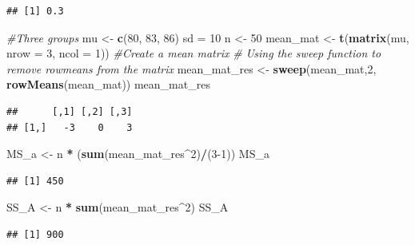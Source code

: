 \documentclass[]{book}
\newenvironment{Shaded}{\begin{snugshade}}{\end{snugshade}}
\newcommand{\CommentTok}[1]{\textcolor[rgb]{0.56,0.35,0.01}{\textit{#1}}}
\newcommand{\DataTypeTok}[1]{\textcolor[rgb]{0.13,0.29,0.53}{#1}}
\newcommand{\DecValTok}[1]{\textcolor[rgb]{0.00,0.00,0.81}{#1}}
\newcommand{\KeywordTok}[1]{\textcolor[rgb]{0.13,0.29,0.53}{\textbf{#1}}}
\newcommand{\NormalTok}[1]{#1}
\newcommand{\OperatorTok}[1]{\textcolor[rgb]{0.81,0.36,0.00}{\textbf{#1}}}
\newcommand{\StringTok}[1]{\textcolor[rgb]{0.31,0.60,0.02}{#1}}
\begin{document}
\begin{verbatim}
## [1] 0.3
\end{verbatim}

\begin{Shaded}
\begin{Highlighting}[]
\CommentTok{#Three groups}
\NormalTok{mu <-}\StringTok{ }\KeywordTok{c}\NormalTok{(}\DecValTok{80}\NormalTok{, }\DecValTok{83}\NormalTok{, }\DecValTok{86}\NormalTok{)}
\NormalTok{sd =}\StringTok{ }\DecValTok{10}
\NormalTok{n <-}\StringTok{ }\DecValTok{50}
\NormalTok{mean_mat <-}\StringTok{ }\KeywordTok{t}\NormalTok{(}\KeywordTok{matrix}\NormalTok{(mu, }
                     \DataTypeTok{nrow =} \DecValTok{3}\NormalTok{,}
                     \DataTypeTok{ncol =} \DecValTok{1}\NormalTok{)) }\CommentTok{#Create a mean matrix}
\CommentTok{# Using the sweep function to remove rowmeans from the matrix}
\NormalTok{mean_mat_res <-}\StringTok{ }\KeywordTok{sweep}\NormalTok{(mean_mat,}\DecValTok{2}\NormalTok{, }\KeywordTok{rowMeans}\NormalTok{(mean_mat))   }
\NormalTok{mean_mat_res}
\end{Highlighting}
\end{Shaded}

\begin{verbatim}
##      [,1] [,2] [,3]
## [1,]   -3    0    3
\end{verbatim}

\begin{Shaded}
\begin{Highlighting}[]
\NormalTok{MS_a <-}\StringTok{ }\NormalTok{n }\OperatorTok{*}\StringTok{ }\NormalTok{(}\KeywordTok{sum}\NormalTok{(mean_mat_res}\OperatorTok{^}\DecValTok{2}\NormalTok{)}\OperatorTok{/}\NormalTok{(}\DecValTok{3-1}\NormalTok{))}
\NormalTok{MS_a}
\end{Highlighting}
\end{Shaded}

\begin{verbatim}
## [1] 450
\end{verbatim}

\begin{Shaded}
\begin{Highlighting}[]
\NormalTok{SS_A <-}\StringTok{ }\NormalTok{n }\OperatorTok{*}\StringTok{ }\KeywordTok{sum}\NormalTok{(mean_mat_res}\OperatorTok{^}\DecValTok{2}\NormalTok{)}
\NormalTok{SS_A}
\end{Highlighting}
\end{Shaded}

\begin{verbatim}
## [1] 900
\end{verbatim}
\end{document}
